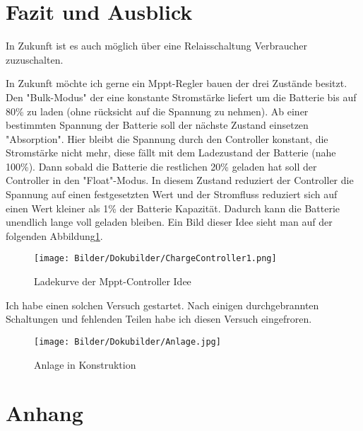 \documentclass [ngerman]{mucproc}
\begin{document}
\section{Fazit und Ausblick}
In Zukunft ist es auch möglich über eine Relaisschaltung Verbraucher zuzuschalten.

In Zukunft möchte ich gerne ein Mppt-Regler bauen der drei Zustände besitzt. Den "Bulk-Modus" der eine konstante Stromstärke liefert um die Batterie bis auf 80\% zu laden (ohne rücksicht auf die Spannung zu nehmen). Ab einer bestimmten Spannung der Batterie soll der nächste Zustand einsetzen "Absorption". Hier bleibt die Spannung durch den Controller konstant, die Stromstärke nicht mehr, diese fällt mit dem Ladezustand der Batterie (nahe 100\%). Dann sobald die Batterie die restlichen 20\% geladen hat soll der Controller in den "Float"-Modus. In diesem Zustand reduziert der Controller die Spannung auf einen festgesetzten Wert und der Stromfluss reduziert sich auf einen Wert kleiner als 1\% der Batterie Kapazität. Dadurch kann die Batterie unendlich lange voll geladen bleiben. Ein Bild dieser Idee sieht man auf der folgenden Abbildung\ref{fig:MPPT Solar Charger Prototype}.

\begin{figure}
			\centering
			\texttt{[image: Bilder/Dokubilder/ChargeController1.png]}
			\caption{Ladekurve der Mppt-Controller Idee}
			\label{fig:MPPT Solar Charger Prototype}
		\end{figure}


Ich habe einen solchen Versuch gestartet. Nach einigen durchgebrannten Schaltungen und fehlenden Teilen habe ich diesen Versuch eingefroren. 


\begin{figure}
		\centering
		\texttt{[image: Bilder/Dokubilder/Anlage.jpg]}
		\caption{Anlage in Konstruktion}
		\label{fig:Solaranlage}
	\end{figure}


\section{Anhang}




\end{document}
